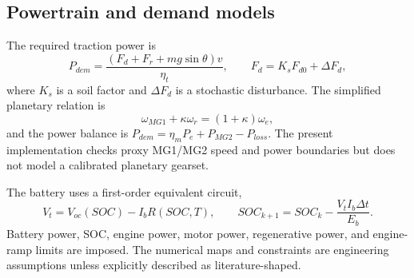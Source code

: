\documentclass[agriengineering,article,submit,moreauthors]{Definitions/mdpi}
\begin{document}
\subsection{Powertrain and demand models}
The required traction power is
\begin{equation}
 P_{dem}=\frac{(F_d+F_r+mg\sin\theta)v}{\eta_t},\qquad
 F_d=K_sF_{d0}+\Delta F_d,
\end{equation}
where $K_s$ is a soil factor and $\Delta F_d$ is a stochastic disturbance. The simplified planetary relation is
\begin{equation}
 \omega_{MG1}+\kappa\omega_r=(1+\kappa)\omega_e,
\end{equation}
and the power balance is $P_{dem}=\eta_mP_e+P_{MG2}-P_{loss}$. The present implementation checks proxy MG1/MG2 speed and power boundaries but does not model a calibrated planetary gearset.

The battery uses a first-order equivalent circuit,
\begin{equation}
 V_t=V_{oc}(SOC)-I_bR(SOC,T),\qquad
 SOC_{k+1}=SOC_k-\frac{V_tI_b\Delta t}{E_b}.
\end{equation}
Battery power, SOC, engine power, motor power, regenerative power, and engine-ramp limits are imposed. The numerical maps and constraints are engineering assumptions unless explicitly described as literature-shaped.
\end{document}
